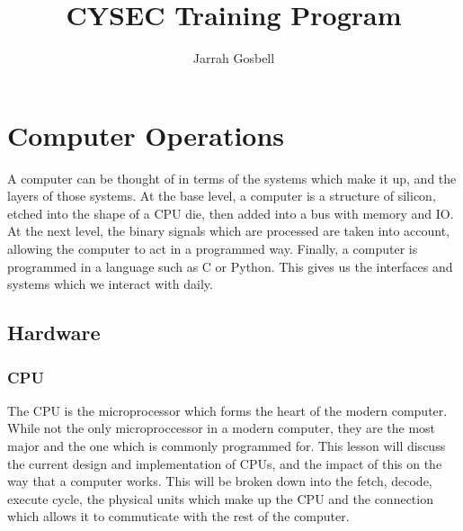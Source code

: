 \documentclass[a4paper,11pt,draft]{article}
\author{Jarrah Gosbell}
\title{CYSEC Training Program}
\begin{document}
\maketitle
\tableofcontents
\newpage
\section{Computer Operations}
	A computer can be thought of in terms of the systems which make it up, and the layers of those systems.
	At the base level, a computer is a structure of silicon, etched into the shape of a CPU die, then added into a bus with memory and IO.
	At the next level, the binary signals which are processed are taken into account, allowing the computer to act in a programmed way. 
	Finally, a computer is programmed in a language such as C or Python. This gives us the interfaces and systems which we interact with daily. 
	\subsection{Hardware}
		\subsubsection{CPU} 
			The CPU is the microprocessor which forms the heart of the modern computer. 
			While not the only microproccessor in a modern computer, they are the most major and the one which is commonly programmed for. 
			This lesson will discuss the current design and implementation of CPUs, and the impact of this on the way that a computer works. 
			This will be broken down into the fetch, decode, execute cycle, the physical units which make up the CPU and the connection which allows it to commuticate with the rest of the computer. 
\end{document}
